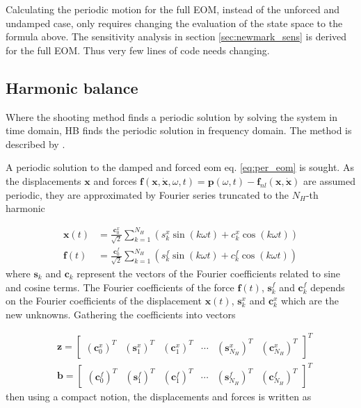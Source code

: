 Calculating the periodic motion for the full EOM, instead of the unforced and
undamped case, only requires changing the evaluation of the state space to the
formula above. The sensitivity analysis in section \ref{sec:newmark_sens} is
derived for the full EOM. Thus very few lines of code needs changing.


\subsection{Harmonic balance}
\label{sec:harmonic_bal}

Where the shooting method finds a periodic solution by solving the system in
time domain, HB finds the periodic solution in frequency domain. The method is
described by \textcite{detroux2016a}.

A periodic solution to the damped and forced eom eq. \eqref{eq:per_eom} is
sought.
As the displacements $\bm x$ and forces $\bm f(\bm x, \dot{\bm x}, \omega ,t) =
\bm p(\omega, t)- \bm f_{nl}(\bm x, \dot{\bm x})$ are assumed periodic, they are
approximated by Fourier series truncated to the $N_H$-th harmonic

\begin{align}
  \label{eq:hb_x_expansion}
  \bm x(t) &= \frac{\bm c^x_0}{\sqrt{2}} \sum_{k=1}^{N_H} (s^x_k \sin(k\omega t) +
          c^x_k \cos(k\omega t)) \\
  \label{eq:hb_f_expansion}
  \bm f(t) &= \frac{\bm c^f_0}{\sqrt{2}} \sum_{k=1}^{N_H} (s^f_k \sin(k\omega t) +
          c^f_k \cos(k\omega t))
\end{align}
where $\bm s_k$ and $\bm c_k$ represent the vectors of the Fourier coefficients
related to sine and cosine terms. The Fourier coefficients of the force $\bm f(t)$,
$\bm s^f_k$ and $\bm c^f_k$ depends on the Fourier coefficients of the
displacement $\bm x(t)$, $\bm s^x_k$ and $\bm c^x_k$ which are the new unknowns.
Gathering the coefficients into vectors

\begin{align}
  \label{eq:hb_coeffz}
  &\bm z =
    \begin{bmatrix}
      (\bm c^x_0)^T & (\bm s^x_1)^T & (\bm c^x_1)^T & \cdots &
      (\bm s^x_{N_H})^T & (\bm c^x_{N_H})^T
    \end{bmatrix}^T \\
  \label{eq:hb_coeffz}
  &\bm b =
    \begin{bmatrix}
      (\bm c^f_0)^T & (\bm s^f_1)^T & (\bm c^f_1)^T & \cdots &
      (\bm s^f_{N_H})^T & (\bm c^f_{N_H})^T
    \end{bmatrix}^T
\end{align}
then using a compact notion, the displacements and forces is written as

